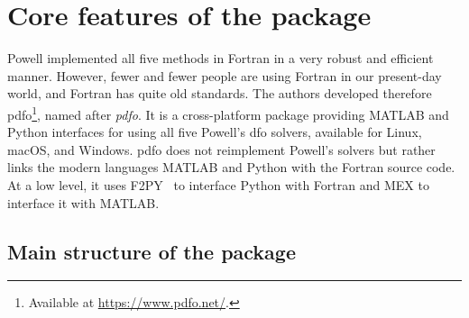 \section{Core features of the  package}
\label{sec:pdfo-core-features}

Powell implemented all five methods in Fortran in a very robust and efficient manner.
However, fewer and fewer people are using Fortran in our present-day world, and Fortran has quite old standards.
The authors developed therefore \gls{pdfo}\footnote{Available at \url{https://www.pdfo.net/}.}, named after \emph{\glsdesc{pdfo}}.
It is a cross-platform package providing MATLAB and Python interfaces for using all five Powell's \gls{dfo} solvers, available for Linux, macOS, and Windows.
\Gls{pdfo} does not reimplement Powell's solvers but rather links the modern languages MATLAB and Python with the Fortran source code.
At a low level, it uses F2PY~\cite{Peterson_2009} to interface Python with Fortran and MEX to interface it with MATLAB.

\subsection{Main structure of the package}


